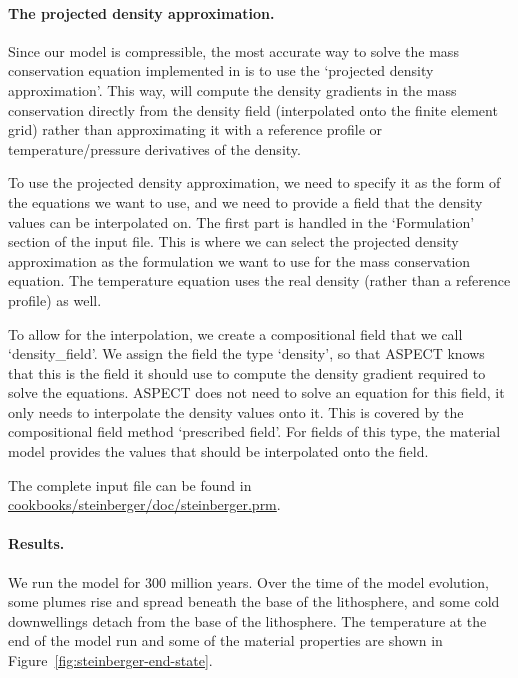 
\paragraph{The projected density approximation.}
Since our model is compressible, the most accurate way to solve the mass 
conservation equation implemented in \aspect{} is to use the `projected density
approximation'. This way, \aspect{} will compute the density gradients in the 
mass conservation directly from the density field (interpolated onto the 
finite element grid) rather than approximating it with a reference profile 
or temperature/pressure derivatives of the density. 

To use the projected density approximation, we need to specify it as the form of the equations we want to use, and we need to provide a field that the density values can be interpolated on. 
The first part is handled in the `Formulation' section of the input file. This is where we can select 
the projected density approximation as the formulation we want to use for the mass conservation equation. 
The temperature equation uses the real density (rather than a reference profile) as well. 

To allow for the interpolation, we create a compositional field that we call `density\_field'. 
We assign the field the type `density', so that ASPECT knows that this is the field it should use to compute the density gradient required to solve the equations. ASPECT does not need to solve an 
equation for this field, it only needs to interpolate the density values onto it. 
This is covered by the compositional field method `prescribed field'. 
For fields of this type, the material model provides the values that should be 
interpolated onto the field.


The complete input file can be found in \url{cookbooks/steinberger/doc/steinberger.prm}. 

\paragraph{Results.} We run the model for 300 million years. Over the time of the model evolution, some plumes rise and spread beneath the base of the lithosphere, and some cold downwellings detach from the base of the lithosphere. The temperature at the end of the model run and some of the material properties are shown in Figure~\ref{fig:steinberger-end-state}. 

